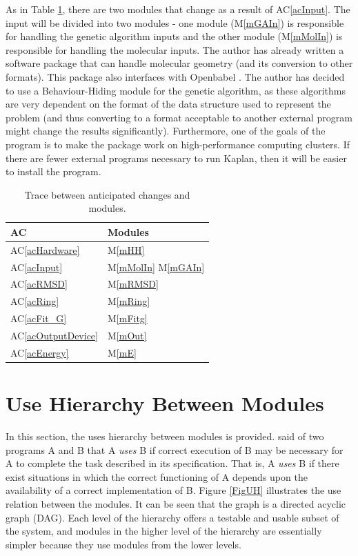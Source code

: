 \documentclass[12pt, titlepage]{article}
\newcommand{\acref}[1]{AC\ref{#1}}
\newcommand{\mref}[1]{M\ref{#1}}
\newcommand{\progname}{Kaplan} %
\begin{document}
As in Table \ref{trace-ACM}, there are two modules that change as a result of 
\acref{acInput}. The input will be divided into two modules - one module 
(\mref{mGAIn}) is responsible for handling the genetic algorithm inputs and the 
other module (\mref{mMolIn}) is responsible for handling the molecular inputs. 
The author has already written a software package that can handle molecular 
geometry (and its conversion to other formats). This package also interfaces 
with Openbabel \cite{obabel}. The author has decided to use a Behaviour-Hiding 
module for the genetic algorithm, as these algorithms are very dependent on the 
format of the data structure used to represent the problem (and thus converting 
to a format acceptable to another external program might change the results 
significantly). Furthermore, one of the goals of the program is to make the 
package work on high-performance computing clusters. If there are fewer 
external programs necessary to run \progname{}, then it will be easier to 
install the program.

\begin{table}[H]
\centering
\begin{tabular}{p{} p{}}
\toprule
\textbf{AC} & \textbf{Modules}\\
\midrule
\acref{acHardware} & \mref{mHH}\\
\acref{acInput} & \mref{mMolIn} \mref{mGAIn} \\
\acref{acRMSD} & \mref{mRMSD} \\
\acref{acRing} & \mref{mRing} \\
\acref{acFit_G} & \mref{mFitg} \\
\acref{acOutputDevice} & \mref{mOut} \\
\acref{acEnergy} & \mref{mE} \\
\bottomrule
\end{tabular}
\caption{Trace between anticipated changes and modules.}
\label{trace-ACM}
\end{table}

\section{Use Hierarchy Between Modules} \label{SecUse}

In this section, the uses hierarchy between modules is
provided. \citet{Parnas1978} said of two programs A and B that A {\em uses} B if
correct execution of B may be necessary for A to complete the task described in
its specification. That is, A {\em uses} B if there exist situations in which
the correct functioning of A depends upon the availability of a correct
implementation of B.  Figure \ref{FigUH} illustrates the use relation between
the modules. It can be seen that the graph is a directed acyclic graph
(DAG). Each level of the hierarchy offers a testable and usable subset of the
system, and modules in the higher level of the hierarchy are essentially simpler
because they use modules from the lower levels.
\end{document}
